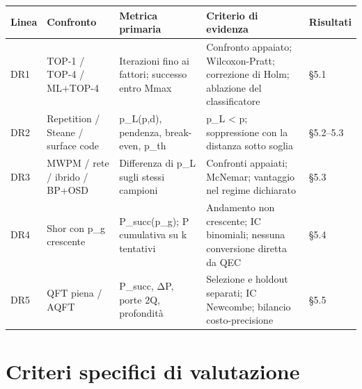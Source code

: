 {\def\LTcaptype{none} %
\begin{longtable}[]{@{}
  >{\centering\arraybackslash}p{}
  >{\raggedright\arraybackslash}p{}
  >{\raggedright\arraybackslash}p{}
  >{\raggedright\arraybackslash}p{}
  >{\raggedright\arraybackslash}p{}@{}}
\toprule\noalign{}
\begin{minipage}[b]{\linewidth}\centering
\textbf{Linea}
\end{minipage} & \begin{minipage}[b]{\linewidth}\centering
\textbf{Confronto}
\end{minipage} & \begin{minipage}[b]{\linewidth}\centering
\textbf{Metrica primaria}
\end{minipage} & \begin{minipage}[b]{\linewidth}\centering
\textbf{Criterio di evidenza}
\end{minipage} & \begin{minipage}[b]{\linewidth}\centering
\textbf{Risultati}
\end{minipage} \\
\midrule\noalign{}
\endhead
\bottomrule\noalign{}
\endlastfoot
DR1 & TOP-1 / TOP-4 / ML+TOP-4 & Iterazioni fino ai fattori; successo entro Mmax & Confronto appaiato; Wilcoxon-Pratt; correzione di Holm; ablazione del classificatore & §5.1 \\
DR2 & Repetition / Steane / surface code & p\_L(p,d), pendenza, break-even, p\_th & p\_L \textless{} p; soppressione con la distanza sotto soglia & §5.2--5.3 \\
DR3 & MWPM / rete / ibrido / BP+OSD & Differenza di p\_L sugli stessi campioni & Confronti appaiati; McNemar; vantaggio nel regime dichiarato & §5.3 \\
DR4 & Shor con p\_g crescente & P\_succ(p\_g); P cumulativa su k tentativi & Andamento non crescente; IC binomiali; nessuna conversione diretta da QEC & §5.4 \\
DR5 & QFT piena / AQFT & P\_succ, ΔP, porte 2Q, profondità & Selezione e holdout separati; IC Newcombe; bilancio costo-precisione & §5.5 \\
\end{longtable}
}

\section{Criteri specifici di valutazione}\label{sec:finale_2_6}

